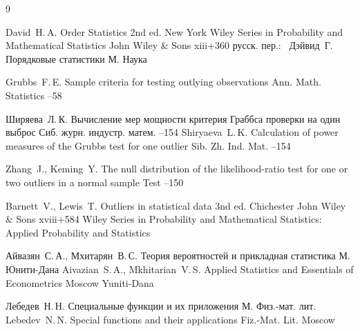 \begin{thebibliography}{9}

\by David~H.\,A.
\book Order Statistics
\bookinfo 2nd ed.
\publaddr New York
\serial Wiley Series in Probability and Mathematical Statistics
\publ John Wiley \& Sons
\totalpages xiii+360 
\rtransl русск. пер.:~
\by Дэйвид~Г.
\book Порядковые статистики
\publaddr М.
\publ Наука

\by Grubbs~F.\,E.
\paper Sample criteria for testing outlying observations
\jour Ann. Math. Statistics
--58


\by Ширяева~Л.\,К.
\paper Вычисление мер мощности критерия Граббса проверки на один выброс
\jour Сиб. журн. индустр. матем.
--154
\misctransl
\by Shiryaeva~L.\,K.
\paper Calculation of power measures of the Grubbs test for one outlier
\jour Sib. Zh. Ind. Mat.
--154

\by Zhang~J., Keming~Y.
\paper The null distribution of the likelihood-ratio test for one or two outliers in a normal sample
\jour Test
--150


\by Barnett~V., Lewis~T.
\book Outliers in statistical data
\bookinfo 3nd ed.
\publaddr Chichester
\publ John Wiley \& Sons
\totalpages xviii+584
\serial Wiley Series in Probability and Mathematical Statistics: Applied Probability and Statistics


\by Айвазян~С.\,А., Мхитарян~В.\,С.
\book Теория вероятностей и прикладная статистика
\publaddr М.
\publ Юнити-Дана
\misctransl
\by Aivazian~S.\,A., Mkhitarian~V.\,S.
\book Applied Statistics and Essentials of Econometrics
\publaddr Moscow
\publ Yuniti-Dana

\by Лебедев~Н.\,Н.
\book Специальные функции и их приложения
\publaddr М.
\publ Физ.-мат. лит.
\misctransl
\by Lebedev~N.\,N.
\book Special functions and their applications
\publ Fiz.-Mat. Lit.
\publaddr Moscow 

\end{thebibliography}


\noindent
\hskip6.5cm \thedate \par\noindent
\hskip6.5cm\therevdate


\makeengtitlem


\newpage

%
